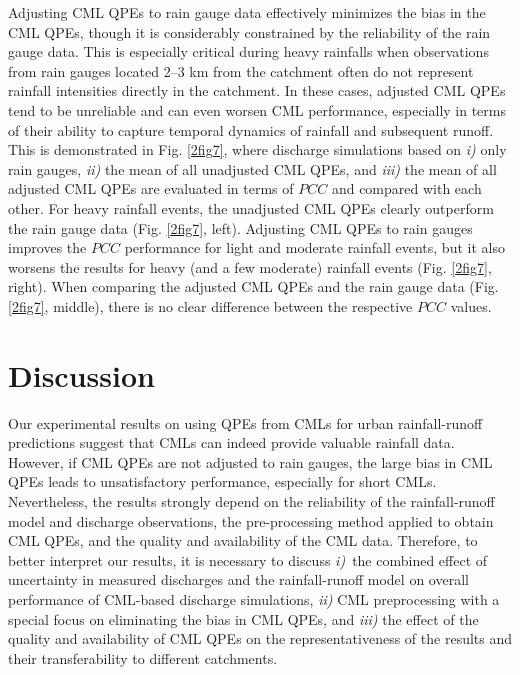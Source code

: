 \documentclass{ctuthesis}\usepackage[]{graphicx}\usepackage[]{color}
\begin{document}
Adjusting CML QPEs to rain gauge data effectively minimizes the bias in the CML QPEs, though it is considerably constrained by the reliability of the rain gauge data. This is especially critical during heavy rainfalls when observations from rain gauges located 2--3 km from the catchment often do not represent rainfall intensities directly in the catchment. In these cases, adjusted CML QPEs tend to be unreliable and can even worsen CML performance, especially in terms of their ability to capture temporal dynamics of rainfall and subsequent runoff. This is demonstrated in Fig. \ref{2fig7}, where discharge simulations based on \emph{i)} only rain gauges, \emph{ii)} the mean of all unadjusted CML QPEs, and \emph{iii)} the mean of all adjusted CML QPEs are evaluated in terms of $PCC$ and compared with each other. For heavy rainfall events, the unadjusted CML QPEs clearly outperform the rain gauge data (Fig. \ref{2fig7}, left). Adjusting CML QPEs to rain gauges improves the $PCC$ performance for light and moderate rainfall events, but it also worsens the results for heavy (and a few moderate) rainfall events (Fig. \ref{2fig7}, right). When comparing the adjusted CML QPEs and the rain gauge data (Fig. \ref{2fig7}, middle), there is no clear difference between the respective $PCC$ values.

\section{Discussion}

Our experimental results on using QPEs from CMLs for urban rainfall-runoff predictions suggest that CMLs can indeed provide valuable rainfall data. However, if CML QPEs are not adjusted to rain gauges, the large bias in CML QPEs leads to unsatisfactory performance, especially for short CMLs. Nevertheless, the results strongly depend on the reliability of the rainfall-runoff model and discharge observations, the pre-processing method applied to obtain CML QPEs, and the quality and availability of the CML data. Therefore, to better interpret our results, it is necessary to discuss \emph{i)}~the combined effect of uncertainty in measured discharges and the rainfall-runoff model on overall performance of CML-based discharge simulations, \emph{ii)} CML preprocessing with a special focus on eliminating the bias in CML QPEs, and \emph{iii)} the effect of the quality and availability of CML QPEs on the representativeness of the results and their transferability to different catchments.
\end{document}
